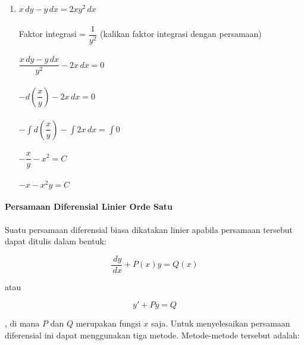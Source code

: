 \begin{enumerate}[1.]
	\item \begin{math} x \, dy - y \, dx = 2xy^{2} \, dx \end{math} \\ \\
	Faktor integrasi = \begin{math} \dfrac{1}{y^{2}} \end{math} (kalikan faktor integrasi dengan persamaan) \\ \\ 
	\begin{math} \dfrac{x \, dy - y \, dx}{y^{2}} - 2x \, dx = 0\end{math} \\ \\
	\begin{math} -d (\dfrac{x}{y}) - 2x \, dx = 0 \end{math} \\ \\
	\begin{math} - \int d (\dfrac{x}{y}) - \int 2x \, dx = \int 0 \end{math} \\ \\
	\begin{math} - \dfrac{x}{y} - x^{2} = C \end{math} \\ \\
	\begin{math} -x - x^{2}y = C\end{math}

\end{enumerate}

\paragraph{Persamaan Diferensial Linier Orde Satu}
\label{par:PDLO1}

Suatu persamaan diferensial biasa dikatakan linier apabila persamaan tersebut dapat ditulis dalam bentuk:

\begin{equation} \dfrac{\, dy}{\, dx} + P(x)y = Q(x) \end{equation}

atau

\begin{equation} y' + Py = Q \end{equation}

, di mana \begin{math} P \end{math} dan \begin{math} Q \end{math} merupakan fungsi \begin{math} x \end{math} saja. Untuk menyelesaikan persamaan diferensial ini dapat menggunakan tiga metode. Metode-metode tersebut adalah:

